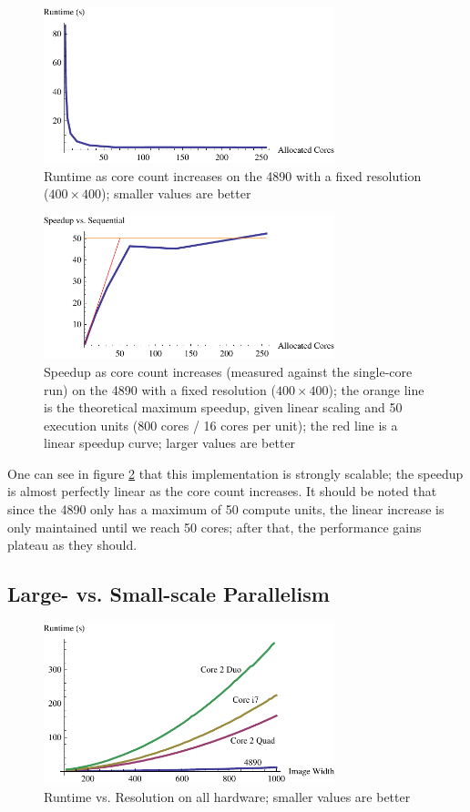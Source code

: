 \documentclass{acmsiggraph}
\begin{document}
\begin{figure}
    \includegraphics[width=84.5mm]{strongPlotOne.pdf}
    \caption{Runtime as core count increases on the 4890 with a fixed resolution ($400\times400$); smaller values are better}
    \label{fig:strongPlotOne}
\end{figure}

\begin{figure}
    \includegraphics[width=84.5mm]{strongPlotTwo.pdf}
    \caption{Speedup as core count increases (measured against the single-core run) on the 4890 with a fixed resolution ($400\times400$); the orange line is the theoretical maximum speedup, given linear scaling and 50 execution units (800 cores / 16 cores per unit); the red line is a linear speedup curve; larger values are better}
    \label{fig:strongPlotTwo}
\end{figure}

One can see in figure \ref{fig:strongPlotTwo} that this implementation is strongly scalable; the speedup is almost perfectly linear as the core count increases. It should be noted that since the 4890 only has a maximum of 50 compute units, the linear increase is only maintained until we reach 50 cores; after that, the performance gains plateau as they should.

\subsection{Large- vs. Small-scale Parallelism}

\begin{figure}
    \includegraphics[width=84.5mm]{runtimePlot.pdf}
    \caption{Runtime vs. Resolution on all hardware; smaller values are better}
    \label{fig:runtimePlot}
\end{figure}
\end{document}
